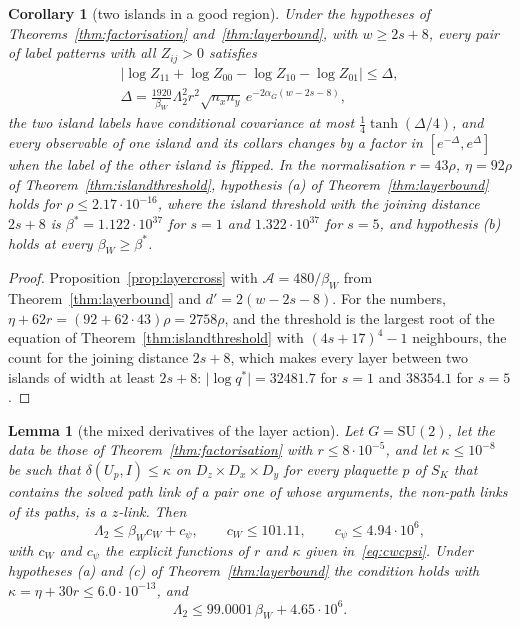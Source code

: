 \documentclass[11pt]{amsart}
\newtheorem{lemma}[theorem]{Lemma}
\newtheorem{corollary}[theorem]{Corollary}
\theoremstyle{definition}
\theoremstyle{remark}
\numberwithin{equation}{section}
\newcommand{\SU}{\mathrm{SU}}
\begin{document}
\begin{corollary}[two islands in a good region]\label{cor:twoislands}
Under the hypotheses of Theorems~\ref{thm:factorisation}
and~\ref{thm:layerbound}, with $w\ge2s+8$, every pair of label patterns
with all $Z_{ij}>0$ satisfies
\[
\begin{gathered}
\bigl\lvert\log Z_{11}+\log Z_{00}-\log Z_{10}-\log Z_{01}\bigr\rvert
\le\varDelta,\\
\varDelta=\frac{1920}{\beta_W}\Lambda_2^2r^2\sqrt{n_xn_y}\,
e^{-2\alpha_G(w-2s-8)},
\end{gathered}
\]
the two island labels have conditional covariance at most
$\frac14\tanh(\varDelta/4)$, and every observable of one island and its
collars changes by a factor in $[e^{-\varDelta},e^{\varDelta}]$ when the
label of the other island is flipped. In the normalisation $r=43\rho$,
$\eta=92\rho$ of Theorem~\ref{thm:islandthreshold}, hypothesis (a) of
Theorem~\ref{thm:layerbound} holds for $\rho\le2.17\cdot10^{-16}$, where
the island threshold with the joining distance $2s+8$ is
$\beta^*=1.122\cdot10^{37}$ for $s=1$ and $1.322\cdot10^{37}$ for $s=5$,
and hypothesis (b) holds at every $\beta_W\ge\beta^*$.
\end{corollary}

\begin{proof}
Proposition~\ref{prop:layercross} with $\mathcal A=480/\beta_W$ from
Theorem~\ref{thm:layerbound} and $d'=2(w-2s-8)$. For the numbers,
$\eta+62r=(92+62\cdot43)\rho=2758\rho$, and the threshold is the largest
root of the equation of Theorem~\ref{thm:islandthreshold} with
$(4s+17)^4-1$ neighbours, the count for the joining distance $2s+8$,
which makes every layer between two islands of width at least $2s+8$:
$\lvert\log q^*\rvert=32481.7$ for $s=1$ and $38354.1$ for $s=5$.
\end{proof}

\begin{lemma}[the mixed derivatives of the layer action]\label{lem:lambdatwo}
Let $G=\SU(2)$, let the data be those of
Theorem~\ref{thm:factorisation} with $r\le8\cdot10^{-5}$, and let
$\kappa\le10^{-8}$ be such that $\delta(U_p,I)\le\kappa$ on
$D_z\times D_x\times D_y$ for every plaquette $p$ of $S_K$ that contains
the solved path link of a pair one of whose arguments, the non-path
links of its paths, is a $z$-link.
Then
\[
\Lambda_2\le\beta_Wc_W+c_\psi,\qquad c_W\le101.11,\qquad
c_\psi\le4.94\cdot10^6,
\]
with $c_W$ and $c_\psi$ the explicit functions of $r$ and $\kappa$ given
in~\eqref{eq:cwcpsi}. Under hypotheses (a) and (c) of
Theorem~\ref{thm:layerbound} the condition holds with
$\kappa=\eta+30r\le6.0\cdot10^{-13}$, and
\[
\Lambda_2\le99.0001\,\beta_W+4.65\cdot10^6 .
\]
\end{lemma}
\end{document}
